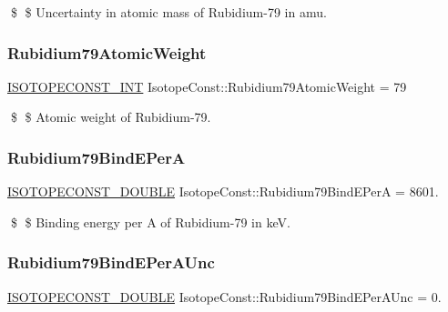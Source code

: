 \$ \$ Uncertainty in atomic mass of Rubidium-\/79 in amu. \mbox{\label{group___isotope_const-_rubidium-_rb79_ga04f17723550f58dd301a28ba2ac47d99}} 
\subsubsection{\texorpdfstring{Rubidium79\+Atomic\+Weight}{Rubidium79AtomicWeight}}
{\footnotesize\ttfamily \mbox{\hyperlink{group___isotope_const-_macros_ga5f18360b3e99483a35c32d789e62621c}{I\+S\+O\+T\+O\+P\+E\+C\+O\+N\+S\+T\+\_\+\+I\+NT}} Isotope\+Const\+::\+Rubidium79\+Atomic\+Weight = 79}

\$ \$ Atomic weight of Rubidium-\/79. \mbox{\label{group___isotope_const-_rubidium-_rb79_ga5dcb18877c834856c6f2be5d56c49ecd}} 
\subsubsection{\texorpdfstring{Rubidium79\+Bind\+E\+PerA}{Rubidium79BindEPerA}}
{\footnotesize\ttfamily \mbox{\hyperlink{group___isotope_const-_macros_ga8f45a7272ce02c0b4c65c44636ed719a}{I\+S\+O\+T\+O\+P\+E\+C\+O\+N\+S\+T\+\_\+\+D\+O\+U\+B\+LE}} Isotope\+Const\+::\+Rubidium79\+Bind\+E\+PerA = 8601.}

\$ \$ Binding energy per A of Rubidium-\/79 in keV. \mbox{\label{group___isotope_const-_rubidium-_rb79_gafd1bf27048004e4cc2d81246c38fa2b7}} 
\subsubsection{\texorpdfstring{Rubidium79\+Bind\+E\+Per\+A\+Unc}{Rubidium79BindEPerAUnc}}
{\footnotesize\ttfamily \mbox{\hyperlink{group___isotope_const-_macros_ga8f45a7272ce02c0b4c65c44636ed719a}{I\+S\+O\+T\+O\+P\+E\+C\+O\+N\+S\+T\+\_\+\+D\+O\+U\+B\+LE}} Isotope\+Const\+::\+Rubidium79\+Bind\+E\+Per\+A\+Unc = 0.}

